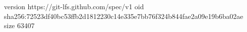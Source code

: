 version https://git-lfs.github.com/spec/v1
oid sha256:72523df40bc53ffb2d1812230c14e335e7bb76f324b844fae2a09e19b6ba02ae
size 63407
